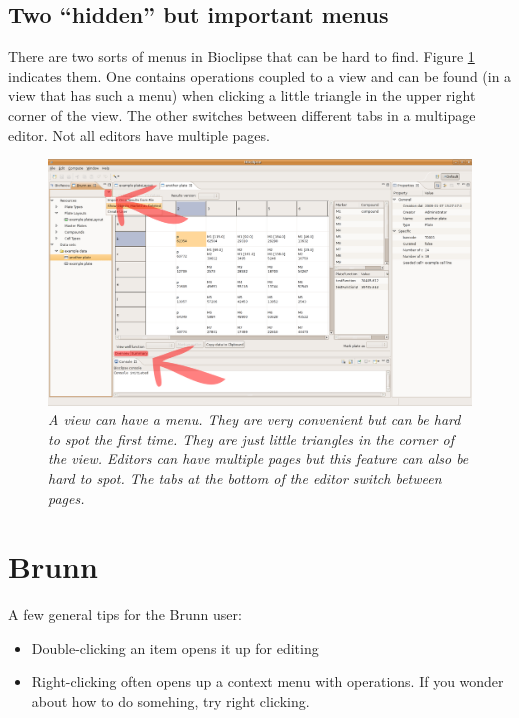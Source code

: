 \documentclass[a4paper,10pt]{article}
\begin{document}
        \subsection{Two ``hidden'' but important menus}

            There are two sorts of menus in Bioclipse that can be
            hard to find. Figure \ref{viewMenu} indicates them. One contains
            operations coupled to a view and can be found (in a view that has
            such a menu) when clicking a little triangle in the upper right
            corner of the view. The other switches between different tabs in a
            multipage editor. Not all editors have multiple pages.
            \begin{figure}[htbp]
                \begin{center}
                    \includegraphics[width=1\textwidth]{images/twoMenues.png}
                \end{center}
                \caption{\textit{A view can have a menu. They are very
                    convenient but can be hard to spot the first time. They are
                    just little triangles in the corner of the view. Editors
                    can have multiple pages but this feature can also be hard
                    to spot. The tabs at the bottom of the editor switch
                    between pages.}}
                \label{viewMenu}
            \end{figure}

    \section{Brunn}
        
         \begin{minipage}{1\textwidth}
            A few general tips for the Brunn user:
            \begin{itemize}
                \item Double-clicking an item opens it up for editing
                \item Right-clicking often opens up a context menu with
                    operations. If you wonder about how to do somehing, try
                    right clicking.
            \end{itemize}
         \end{minipage}
\end{document}
